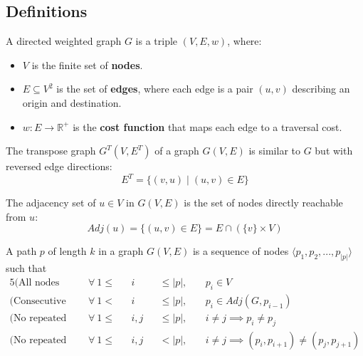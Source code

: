 \subsection{Definitions}
\begin{definition}
    A directed weighted graph $G$ is a triple $(V, E, w)$, where:
    \begin{itemize}
        \item $V$ is the finite set of \textbf{nodes}.
        \item $E \subseteq V^2$ is the set of \textbf{edges}, where each edge is a pair $(u,v)$ describing an origin and destination.
        \item $w: E \rightarrow \mathbb{R}^+$ is the \textbf{cost function} that maps each edge to a traversal cost.
    \end{itemize}
\end{definition}
\begin{definition}
    The transpose graph $G^T(V, E^T)$ of a graph $G(V, E)$ is similar to $G$ but with reversed edge directions:
    \begin{equation*}
        E^T = \{(v,u) \mid (u,v) \in E\}
    \end{equation*}
\end{definition}
\begin{definition}
    The adjacency set of $u \in V$ in $G(V,E)$ is the set of nodes directly reachable from $u$:
    \begin{equation*}
        Adj(u) = \{(u, v) \in E\} = E \cap (\{v\}\times V)
    \end{equation*}
\end{definition}
\begin{definition}[Path]
    A path $p$ of length $k$ in a graph $G(V,E)$ is a sequence of nodes $\langle p_1,p_2,...,p_{|p|}\rangle$ such that
    \begin{alignat*}{5}
        \text{(All nodes belong to the graph)}       ~~&\forall~1 \leq &&i   &&\leq |p|,&&~p_i \in V \\
        \text{(Consecutive nodes are adjacent)}      ~~&\forall~1 <    &&i   &&\leq |p|,&&~p_i \in Adj(G, p_{i-1})\\
        \text{(No repeated nodes)}                   ~~&\forall~1 \leq &&i,j &&\leq |p|,&&~i\neq j \implies p_i \neq p_j \\
        \text{(No repeated edges)}                   ~~&\forall~1 \leq &&i,j &&<    |p|,&&~i\neq j \implies (p_i,p_{i+1}) \neq (p_j, p_{j+1})
    \end{alignat*}
\end{definition}
